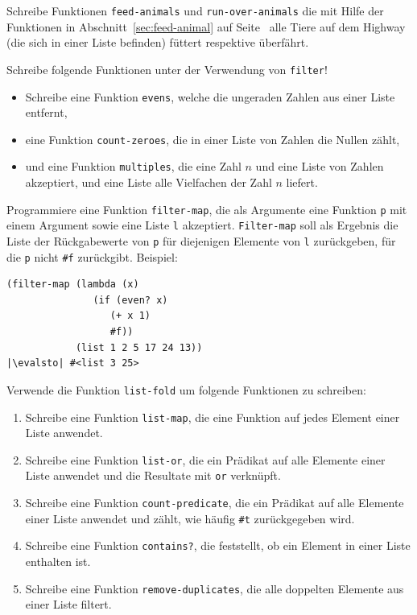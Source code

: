 \begin{aufgabe}
  Schreibe Funktionen \lstinline{feed-animals} und
  \lstinline{run-over-animals} die mit Hilfe der Funktionen in
  Abschnitt~\ref{sec:feed-animal} auf Seite~\pageref{sec:feed-animal}
  alle Tiere auf dem Highway (die sich in einer Liste befinden)
  füttert respektive überfährt.
\end{aufgabe}

\begin{aufgabe}
  Schreibe folgende Funktionen unter der  
  Verwendung von \lstinline{filter}!
  \begin{itemize}
    \item Schreibe eine Funktion \lstinline{evens}, welche die ungeraden Zahlen aus 
      einer Liste entfernt,
  \item eine Funktion \lstinline{count-zeroes}, die in einer Liste von
    Zahlen die Nullen zählt,
  \item und eine Funktion \lstinline{multiples}, die eine Zahl $n$ und
    eine Liste von Zahlen akzeptiert, und eine Liste alle Vielfachen
    der Zahl $n$ liefert.
  \end{itemize}
\end{aufgabe}

\begin{aufgabe}
  Programmiere eine Funktion
  \lstinline{filter-map}, die als Argumente eine Funktion \lstinline{p} mit
  einem Argument sowie eine Liste \lstinline{l} akzeptiert.
  \lstinline{Filter-map} soll als Ergebnis die Liste der Rückgabewerte
  von \lstinline{p} für diejenigen Elemente von \lstinline{l} zurückgeben,
  für die \lstinline{p} nicht \lstinline{#f} zurückgibt. Beispiel:

\begin{lstlisting}
(filter-map (lambda (x)
               (if (even? x)
                  (+ x 1)
                  #f))
            (list 1 2 5 17 24 13))
|\evalsto| #<list 3 25>
\end{lstlisting}
\end{aufgabe}

\begin{aufgabe}
  Verwende die Funktion \lstinline{list-fold} um folgende 
  Funktionen zu schreiben:
  \begin{enumerate}
  \item Schreibe eine Funktion \lstinline{list-map}, die eine Funktion auf jedes
    Element einer Liste anwendet.
  \item Schreibe eine Funktion \lstinline{list-or}, die ein Prädikat auf alle
    Elemente einer Liste anwendet und die Resultate mit \lstinline{or}
    verknüpft.
  \item Schreibe eine Funktion \lstinline{count-predicate}, die ein Prädikat auf
    alle Elemente einer Liste anwendet und zählt, wie häufig \lstinline{#t}
    zurückgegeben wird.
  \item Schreibe eine Funktion \lstinline{contains?}, die feststellt, ob ein
    Element in einer Liste enthalten ist.
  \item Schreibe eine Funktion \lstinline{remove-duplicates}, die alle doppelten
    Elemente aus einer Liste filtert.
  \end{enumerate}
\end{aufgabe}

